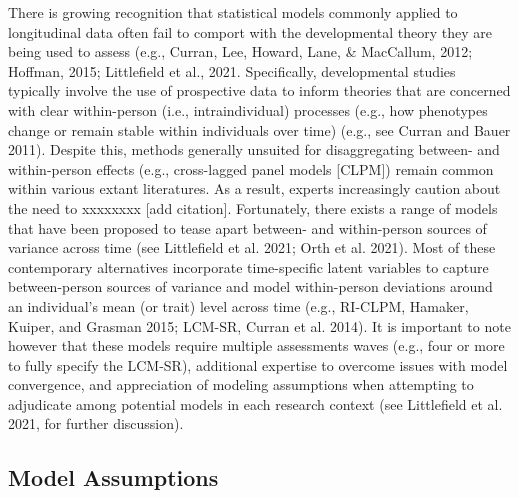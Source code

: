 \documentclass[
  letterpaper,
  DIV=11,
  numbers=noendperiod]{scrartcl}
\begin{document}
There is growing recognition that statistical models commonly applied to
longitudinal data often fail to comport with the developmental theory
they are being used to assess (e.g., Curran, Lee, Howard, Lane, \&
MacCallum, 2012; Hoffman, 2015; Littlefield et al., 2021. Specifically,
developmental studies typically involve the use of prospective data to
inform theories that are concerned with clear within-person (i.e.,
intraindividual) processes (e.g., how phenotypes change or remain stable
within individuals over time) (e.g., see Curran and Bauer 2011). Despite
this, methods generally unsuited for disaggregating between- and
within-person effects (e.g., cross-lagged panel models {[}CLPM{]})
remain common within various extant literatures. As a result, experts
increasingly caution about the need to xxxxxxxx {[}add citation{]}.
Fortunately, there exists a range of models that have been proposed to
tease apart between- and within-person sources of variance across time
(see Littlefield et al. 2021; Orth et al. 2021). Most of these
contemporary alternatives incorporate time-specific latent variables to
capture between-person sources of variance and model within-person
deviations around an individual's mean (or trait) level across time
(e.g., RI-CLPM, Hamaker, Kuiper, and Grasman 2015; LCM-SR, Curran et al.
2014). It is important to note however that these models require
multiple assessments waves (e.g., four or more to fully specify the
LCM-SR), additional expertise to overcome issues with model convergence,
and appreciation of modeling assumptions when attempting to adjudicate
among potential models in each research context (see Littlefield et al.
2021, for further discussion).

\hypertarget{model-assumptions}{%
\subsection{Model Assumptions}\label{model-assumptions}}
\end{document}
